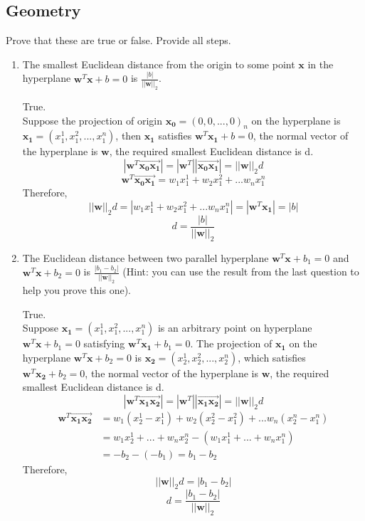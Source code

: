 \documentclass[a4paper]{article}
\theoremstyle{definition}
\newenvironment{soln}{
    \leavevmode\color{blue}\ignorespaces
}{}
\begin{document}
\subsection{Geometry}
Prove that these are true or false. Provide all steps.
\begin{enumerate}
\item 	The smallest Euclidean distance from the origin to some point $\mathbf{x}$ in the hyperplane $\mathbf{w}^T\mathbf{x} + b = 0$ is $\frac{|b|}{||\mathbf{w}||_2}$.\\
\begin{soln}
True.\\ 
Suppose the projection of origin $\mathbf{x_0} = (0,0,...,0)_n$ on the hyperplane is $\mathbf{x_1} = (x_1^1, x_1^2, ..., x_1^n)$, then $\mathbf{x_1}$ satisfies $\mathbf{w}^T\mathbf{x_1} + b = 0$, the normal vector of the hyperplane is $\mathbf{w}$, the required smallest Euclidean distance is d. \\
$$
|\mathbf{w}^T\overrightarrow{\mathbf{x_0x_1}}| = |\mathbf{w}^T||\overrightarrow{\mathbf{x_0x_1}}| = ||\mathbf{w}||_2d
$$
$$
\mathbf{w}^T\overrightarrow{\mathbf{x_0x_1}} = w_1x_1^1 + w_2x_1^2 + ... w_nx_1^n
$$
Therefore, $$
||\mathbf{w}||_2d = |w_1x_1^1 + w_2x_1^2 + ... w_nx_1^n| = |\mathbf{w}^T\mathbf{x_1}| = |b|
$$
$$
d = \frac{|b|}{||\mathbf{w}||_2}
$$
\end{soln}

\item 	The Euclidean distance between two parallel hyperplane $\mathbf{w}^T\mathbf{x} + b_1 = 0$ and $\mathbf{w}^T\mathbf{x} + b_2 = 0$ is $\frac{|b_1 - b_2|}{||\mathbf{w}||_2}$ (Hint: you can use the result from the last question to help you prove this one).

\begin{soln}
True. \\
Suppose $\mathbf{x_1} = (x_1^1, x_1^2, ..., x_1^n)$ is an arbitrary point on hyperplane $\mathbf{w}^T\mathbf{x} + b_1 = 0$ satisfying $\mathbf{w}^T\mathbf{x_1} + b_1 = 0$. The projection of $\mathbf{x_1}$ on the hyperplane $\mathbf{w}^T\mathbf{x} + b_2 = 0$ is $\mathbf{x_2} = (x_2^1, x_2^2, ..., x_2^n)$, which satisfies $\mathbf{w}^T\mathbf{x_2} + b_2 = 0$, the normal vector of the hyperplane is $\mathbf{w}$, the required smallest Euclidean distance is d. \\
$$
|\mathbf{w}^T\overrightarrow{\mathbf{x_1x_2}}| = |\mathbf{w}^T||\overrightarrow{\mathbf{x_1x_2}}| = ||\mathbf{w}||_2d
$$
\begin{equation*}
\begin{aligned}
\mathbf{w}^T\overrightarrow{\mathbf{x_1x_2}} &= w_1(x_2^1 - x_1^1) + w_2(x_2^2 - x_1^2) + ... w_n(x_2^n - x_1^n) \\ &= w_1x_2^1 + ... + w_nx_2^n - (w_1x_1^1 + ... + w_nx_1^n) \\ &= -b_2-(-b_1) = b_1 - b_2
\end{aligned}
\end{equation*}
Therefore, $$
||\mathbf{w}||_2d = |b_1 - b_2|
$$
$$
d = \frac{|b_1 - b_2|}{||\mathbf{w}||_2}
$$
\end{soln}

\end{enumerate}
\end{document}
